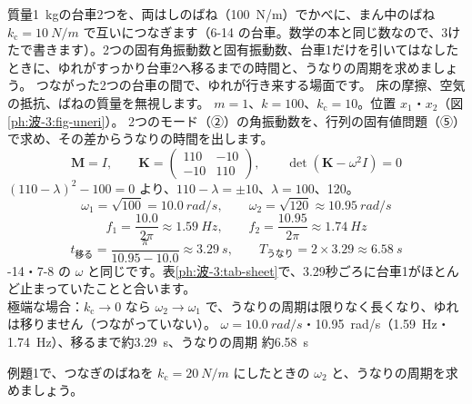 \label{ph:波-3:ex1}
\begin{phreidai}[6-14 の2台車のモードとうなり]
質量\qty{1}{kg}の台車2つを、両はしのばね（\qty{100}{N/m}）でかべに、まん中のばね $k_{\mathrm c}=\qty{10}{N/m}$ で互いにつなぎます（6-14 の台車。数学の本と同じ数なので、3けたで書きます）。2つの固有角振動数と固有振動数、台車1だけを引いてはなしたときに、ゆれがすっかり台車2へ移るまでの時間と、うなりの周期を求めましょう。
\phbamen
つながった2つの台車の間で、ゆれが行き来する場面です。
\phmushi
床の摩擦、空気の抵抗、ばねの質量を無視します。
\phzu
$m=1$、$k=100$、$k_{\mathrm c}=10$。位置 $x_1$・$x_2$（図\ref{ph:波-3:fig-uneri}）。
\phriyu
2つのモード（②）の角振動数を、行列の固有値問題（⑤）で求め、その差からうなりの時間を出します。
\phtateru
\[\mathbf M=I,\qquad\mathbf K=\begin{pmatrix}110&-10\\-10&110\end{pmatrix},\qquad\det(\mathbf K-\omega^2I)=0\]
\phtoku
$(110-\lambda)^2-100=0$ より、$110-\lambda=\pm10$、$\lambda=100$、120。
\[\omega_1=\sqrt{100}=\qty{10.0}{rad/s},\qquad\omega_2=\sqrt{120}\approx\qty{10.95}{rad/s}\]
\[f_1=\frac{10.0}{2\pi}\approx\qty{1.59}{Hz},\qquad f_2=\frac{10.95}{2\pi}\approx\qty{1.74}{Hz}\]
\[t_{\text{移る}}=\frac{\pi}{10.95-10.0}\approx\qty{3.29}{s},\qquad T_{\text{うなり}}=2\times3.29\approx\qty{6.58}{s}\]
-14・7-8 の $\omega$ と同じです。表\ref{ph:波-3:tab-sheet}で、3.29秒ごろに台車1がほとんど止まっていたことと合います。\\
極端な場合：$k_{\mathrm c}\to0$ なら $\omega_2\to\omega_1$ で、うなりの周期は限りなく長くなり、ゆれは移りません（つながっていない）。
\kotae $\omega=\qty{10.0}{rad/s}$・\qty{10.95}{rad/s}（\qty{1.59}{Hz}・\qty{1.74}{Hz}）、移るまで約\qty{3.29}{s}、うなりの周期 約\qty{6.58}{s}
\end{phreidai}
\begin{jibun}
例題1で、つなぎのばねを $k_{\mathrm c}=\qty{20}{N/m}$ にしたときの $\omega_2$ と、うなりの周期を求めましょう。
\end{jibun}

